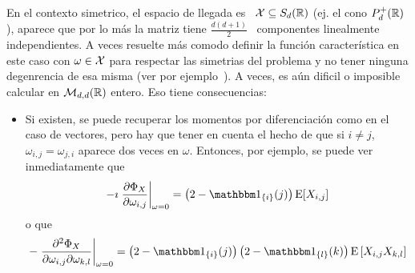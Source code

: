 


En  el  contexto  simetrico, \ie  el  espacio  de  llegada  es \  $\mathcal{X}  \subseteq
S_d(\mathbb{R})$ (ej.   el cono $P_d^+(\mathbb{R})$), aparece  que por lo  m\'as la matriz
tiene  $\frac{d (d+1)}{2}$  \  componentes linealmente  independientes. A  veces
resuelte m\'as  comodo definir  la funci\'on caracter\'istica  en este  caso con
$\omega \in  \mathcal{X}$ para respectar  las simetrias del  problema y no  tener ninguna
degenrencia de esa misma (ver  por ejemplo~\cite{PedRic91, And03}).  A veces, es
a\'un  dificil  o imposible  calcular  en  $\mathcal{M}_{d,d}(\mathbb{R})$  entero. Eso  tiene
consecuencias:
%
\begin{itemize}
\item Si existen,  se puede recuperar los momentos  por diferenciaci\'on como en
  el caso de  vectores, pero hay que tener  en cuenta el hecho de que  si $i \ne
  j$, $\omega_{i,j} = \omega_{j,i}$ aparece dos veces en $\omega$. Entonces, por
  ejemplo, se puede ver inmediatamente que
  \[
  -\imath \left. \frac{\partial \Phi_X}{\partial \omega_{i,j}} \right|_{\omega =
    0} = \left( 2 - \un_{\{i\}}(j) \right) \Esp[X_{i,j}]
  \]
  o que
  \[
  - \left. \frac{\partial^2 \Phi_X}{\partial \omega_{i,j} \partial \omega_{k,l}}
  \right|_{\omega  =  0}  =  \left(  2  -  \un_{\{i\}}(j)  \right)  \left(  2  -
    \un_{\{l\}}(k) \right) \Esp\left[ X_{i,j} X_{k,l} \right]
  \]
\end{itemize}
